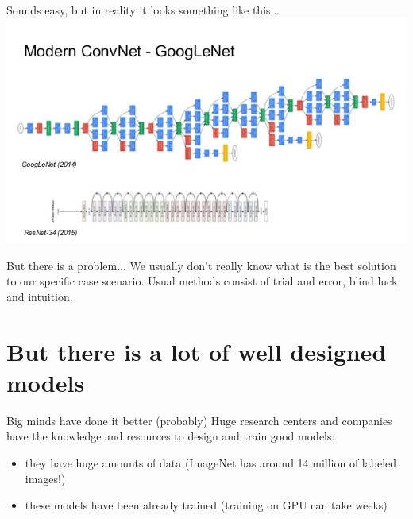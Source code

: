 \documentclass[aspectratio=1610,english]{beamer} %
\begin{document}
 	\begin{frame}{Sounds easy, but in reality it looks something like this...}
 	\centering
	 \includegraphics[scale=0.6]{images/design}
	\end{frame}
 
	\begin{frame}{But there is a problem...}
		We usually don't really know what is the best solution to our specific case scenario.
		\newline
		\newline
		Usual methods consist of trial and error, blind luck, and intuition.
	
	 \end{frame}
 
 	\section{But there is a lot of well designed models}
	\begin{frame}{Big minds have done it better (probably)}
	Huge research centers and companies have the knowledge and resources to design and train good models:
		 \begin{itemize}
		 	\item they have huge amounts of data (ImageNet has around 14 million of labeled images!)
		 	\item these models have been already trained (training on GPU can take weeks)
		 \end{itemize}
	\end{frame}
\end{document}
